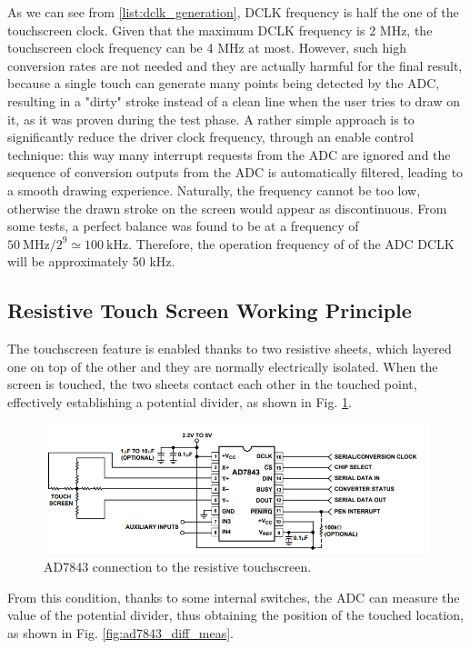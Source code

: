 \documentclass[11pt]{report}
\begin{document}
As we can see from \ref{list:dclk_generation}, DCLK frequency is half the one of the touchscreen clock. Given that the maximum DCLK frequency is 2 MHz, the touchscreen clock frequency can be 4 MHz at most. However, such high conversion rates are not needed and they are actually harmful for the final result, because a single touch can generate many points being detected by the ADC, resulting in a "dirty" stroke instead of a clean line when the user tries to draw on it, as it was proven during the test phase. A rather simple approach is to significantly reduce the driver clock frequency, through an enable control technique: this way many interrupt requests from the ADC are ignored and the sequence of conversion outputs from the ADC is automatically filtered, leading to a smooth drawing experience. Naturally, the frequency cannot be too low, otherwise the drawn stroke on the screen would appear as discontinuous. From some tests, a perfect balance was found to be at a frequency of $\SI{50}{\mega\hertz}/2^9\simeq\SI{100}{\kilo\hertz}$. Therefore, the operation frequency of of the ADC DCLK will be approximately 50 kHz.

\subsection{Resistive Touch Screen Working Principle}\label{ref:sec:touchscree_principle}
The touchscreen feature is enabled thanks to two resistive sheets, which layered one on top of the other and they are normally electrically isolated. When the screen is touched, the two sheets contact each other in the touched point, effectively establishing a potential divider, as shown in Fig. \ref{fig:ad7843_circuit}.

\begin{figure}[!h]
    \centering
    \includegraphics[width=0.8\linewidth]{images/graphic_interface_design/LT24_touchscreen_driver/ad7843_circuit.png}
    \caption{AD7843 connection to the resistive touchscreen.}
    \label{fig:ad7843_circuit}
\end{figure}

From this condition, thanks to some internal switches, the ADC can measure the value of the potential divider, thus obtaining the position of the touched location, as shown in Fig. \ref{fig:ad7843_diff_meas}.
\end{document}
